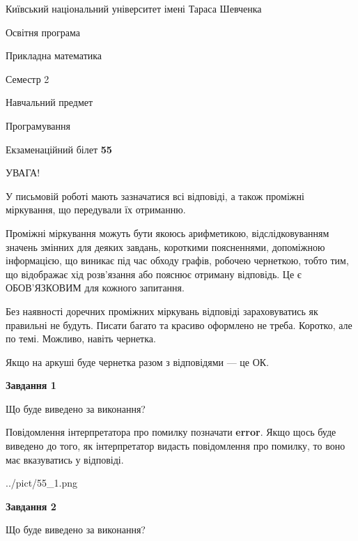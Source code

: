 \documentclass[12pt, ukrainian]{article}
\begin{document}
{{\begin {small}\par
{ \center  Київський національний університет імені Тараса Шевченка \par}
{\parbox {5 cm}{Освітня програма \hfill}{\parbox {7 cm}{Прикладна математика \hfill}}\parbox {6 cm}{\hfill Семестр 2}}\par
{\parbox {5 cm} {Навчальний предмет \hfill}\parbox {7 cm}{Програмування \hfill}\parbox {6cm}{\hfill}\par}\vspace{-7pt} \end{small}}{\center Екзаменаційний білет \No \textbf
{ 55 }\par}}
{
\begin {large}
УВАГА!

У письмовій роботі мають зазначатися всі відповіді, а також проміжні міркування, що передували їх отриманню.

Проміжні міркування можуть бути якоюсь арифметикою, відслідковуванням зна\-чень змінних для деяких завдань,
короткими поясненнями, допоміжною інформацією, що виникає під час обходу графів, робочею чернеткою,
тобто тим, що відображає хід розв’язання або пояснює отриману відповідь.
Це є ОБОВ’ЯЗКОВИМ для кожного запитання.

Без наявності доречних проміжних міркувань відповіді зараховуватись як правиль\-ні не будуть.
Писати багато та красиво оформлено не треба. Коротко, але по темі. Можли\-во, навіть чернетка.

Якщо на аркуші буде чернетка разом з відповідями --- це ОК.

\newpage

{\begin {center}\textbf{Завдання 1}\end {center}}\par
Що буде виведено за виконання?

Повідомлення інтерпретатора про помилку позначати \textbf{error}.
Якщо щось буде виведено до того, як інтерпретатор видасть повідомлення про помилку, 
то воно має вказуватись у відповіді. \par


\begin{center}
	{../pict/55_1.png}
\end{center}
\newpage

{\begin {center}\textbf{Завдання 2}\end {center}}\par
Що буде виведено за виконання?


\end{large}}
\end{document}
